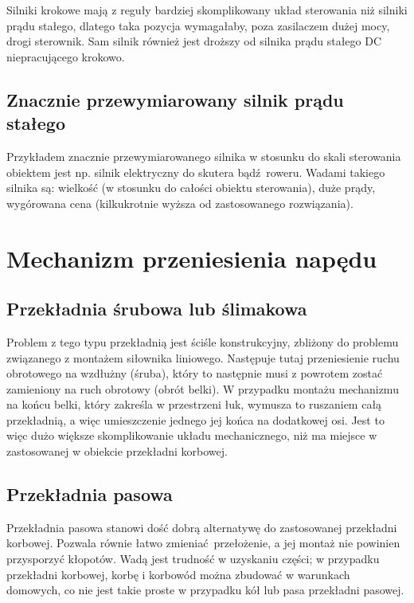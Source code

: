 Silniki krokowe mają z reguły bardziej skomplikowany układ sterowania niż silniki prądu stałego, dlatego taka pozycja wymagałaby, poza zasilaczem dużej mocy, drogi sterownik. Sam silnik również jest droższy od silnika prądu stałego DC niepracującego krokowo.

\subsection{Znacznie przewymiarowany silnik prądu stałego}

Przykładem znacznie przewymiarowanego silnika w stosunku do skali sterowania obiektem jest np. silnik elektryczny do skutera bądź roweru. Wadami takiego silnika są: wielkość (w stosunku do całości obiektu sterowania), duże prądy, wygórowana cena (kilkukrotnie wyższa od zastosowanego rozwiązania).


\section{Mechanizm przeniesienia napędu}

\subsection{Przekładnia śrubowa lub ślimakowa}

Problem z tego typu przekładnią jest ściśle konstrukcyjny, zbliżony do problemu związanego z montażem siłownika liniowego. Następuje tutaj przeniesienie ruchu obrotowego na wzdłużny (śruba), który to następnie musi z powrotem zostać zamieniony na ruch obrotowy (obrót belki). W przypadku montażu mechanizmu na końcu belki, który zakreśla w przestrzeni łuk, wymusza to ruszaniem całą przekładnią, a więc umieszczenie jednego jej końca na dodatkowej osi. Jest to więc dużo większe skomplikowanie układu mechanicznego, niż ma miejsce w zastosowanej w obiekcie przekładni korbowej.

\subsection{Przekładnia pasowa}

Przekładnia pasowa stanowi dość dobrą alternatywę do zastosowanej przekładni korbowej. Pozwala równie łatwo zmieniać przełożenie, a jej montaż nie powinien przysporzyć kłopotów. Wadą jest trudność w uzyskaniu części; w przypadku przekładni korbowej, korbę i korbowód można zbudować w warunkach domowych, co nie jest takie proste w przypadku kół lub pasa przekładni pasowej.